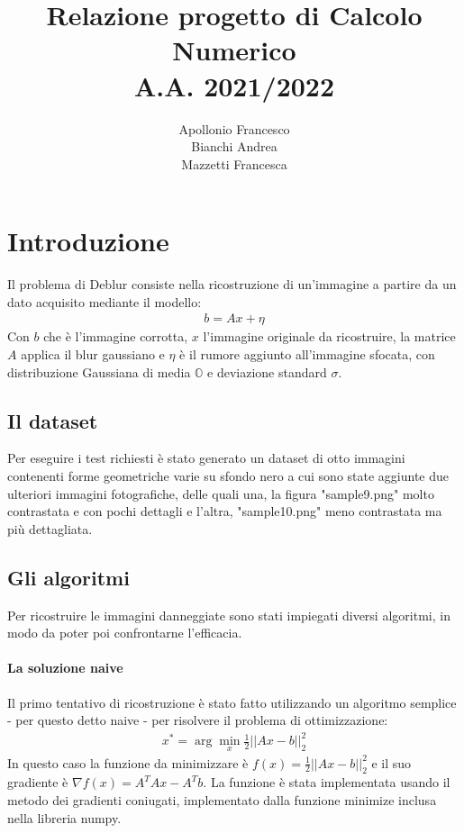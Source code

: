 \documentclass[12pt]{article}
\title{Relazione progetto di Calcolo Numerico\\ A.A. 2021/2022}
\author{Apollonio Francesco\\Bianchi Andrea\\Mazzetti Francesca}
\begin{document}
\begin{titlepage}
\maketitle
{}
\end{titlepage}
\newpage
\tableofcontents
\newpage
{}

\section{Introduzione}

    Il problema di Deblur consiste nella ricostruzione di un'immagine a partire da un dato acquisito mediante il modello:
    \begin{align*}
        b = Ax + \eta
    \end{align*}
    Con $b$ che è l'immagine corrotta, $x$ l'immagine originale da ricostruire, la matrice $A$ applica il blur gaussiano e $\eta$ è il rumore aggiunto all'immagine sfocata, con distribuzione Gaussiana di media $\mathbb{O}$ e deviazione standard $\sigma$.

    \subsection{Il dataset}
    Per eseguire i test richiesti è stato generato un dataset di otto immagini contenenti forme geometriche varie su sfondo nero a cui sono state aggiunte due ulteriori immagini fotografiche, delle quali una, la figura "sample9.png" molto contrastata e con pochi dettagli e l'altra, "sample10.png" meno contrastata ma più dettagliata.

    \subsection{Gli algoritmi}
    Per ricostruire le immagini danneggiate sono stati impiegati diversi algoritmi, in modo da poter poi confrontarne l'efficacia.

    \paragraph{La soluzione naive}
    Il primo tentativo di ricostruzione è stato fatto utilizzando un algoritmo semplice - per questo detto naive - per risolvere il problema di ottimizzazione:
    \begin{align*}
        x^* = \arg\min_x \frac{1}{2} ||Ax - b||_2^2
    \end{align*}
    In questo caso la funzione da minimizzare è $f(x) = \frac{1}{2} ||Ax - b||_2^2$ e il suo gradiente è $\nabla f(x) = A^TAx - A^Tb$. La funzione è stata implementata usando il metodo dei gradienti coniugati, implementato dalla funzione minimize inclusa nella libreria numpy.
\end{document}
